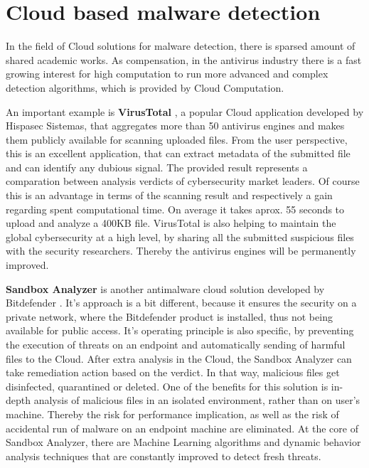 \section{Cloud based malware detection}
\label{section:relatedWorkCloud}
In the field of Cloud solutions for malware detection, there is sparsed amount of shared academic works. As compensation, in the antivirus industry there is a fast growing interest for high computation to run more advanced and complex detection algorithms, which is provided by Cloud Computation. \par
An important example is \textbf{VirusTotal} \cite{virustotal}, a popular Cloud application developed by Hispasec Sistemas, that aggregates more than 50 antivirus engines and makes them publicly available for scanning uploaded files. From the user perspective, this is an excellent application, that can extract metadata of the submitted file and can identify any dubious signal. The provided result represents a comparation between analysis verdicts of cybersecurity market leaders. Of course this is an advantage in terms of the scanning result and respectively a gain regarding spent computational time. On average it takes aprox. 55 seconds to upload and analyze a 400KB file. VirusTotal is also helping to maintain the global cybersecurity at a high level, by sharing all the submitted suspicious files with the security researchers. Thereby the antivirus engines will be permanently improved. \par
\textbf{Sandbox Analyzer} is another antimalware cloud solution developed by Bitdefender \cite{bdSandbox}. It's approach is a bit different, because it
ensures the security on a private network, where the Bitdefender product is installed, thus not being available for public access. It's operating principle is also specific, by preventing the execution of threats on an endpoint and automatically sending of harmful files to the Cloud. After extra analysis in the Cloud, the Sandbox Analyzer can take remediation action based on the verdict. In that way, malicious files get disinfected, quarantined or deleted. One of the benefits for this solution is in-depth analysis of malicious files in an isolated environment, rather than on user's machine. Thereby the risk for performance implication, as well as the risk of accidental run of malware on an endpoint machine are eliminated. At the core of Sandbox Analyzer, there are Machine Learning algorithms and dynamic behavior analysis techniques that are constantly improved to detect fresh threats.

